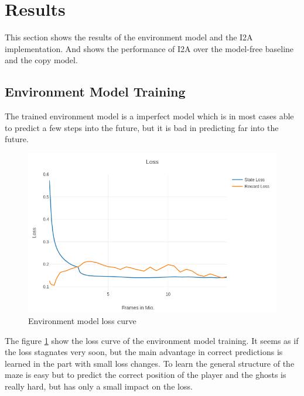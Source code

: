 \section{Results}

This section shows the results of the environment model and the I2A implementation. And shows the performance of I2A over the model-free baseline and the copy model.


\subsection{Environment Model Training}

The trained environment model is a imperfect model which is in most cases able to predict a few steps into the future, but it is bad in predicting far into the future.\\

\begin{figure}[H] 
  \centering   
  \includegraphics[width=0.9\columnwidth]{./Images/hunt_environment_model_loss.png}
  \caption{Environment model loss curve} 
  \label{fig:env_model_loss} 
\end{figure} 

The figure \ref{fig:env_model_loss} show the loss curve of the environment model training. It seems as if the loss stagnates very soon, but the main advantage in correct predictions is learned in the part with small loss changes. To learn the general structure of the maze is easy but to predict the correct position of the player and the ghosts is really hard, but has only a small impact on the loss.


